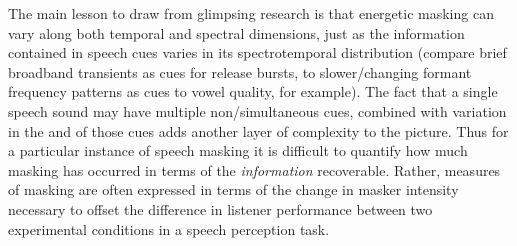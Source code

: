 
The main lesson to draw from glimpsing research is that energetic masking can vary along both temporal and spectral dimensions, just as the information contained in speech cues varies in its spectrotemporal distribution (compare brief broadband transients as cues for release bursts, to slower\-/changing formant frequency patterns as cues to vowel quality, for example).  The fact that a single speech sound may have multiple non\-/simultaneous cues, combined with variation in the  and  of those cues adds another layer of complexity to the picture.\footnotemark{}  Thus for a particular instance of speech masking it is difficult to quantify how much masking has occurred in terms of the \emph{information} recoverable.  Rather, measures of masking are often expressed in terms of the change in masker intensity necessary to offset the difference in listener performance between two experimental conditions in a speech perception task.
